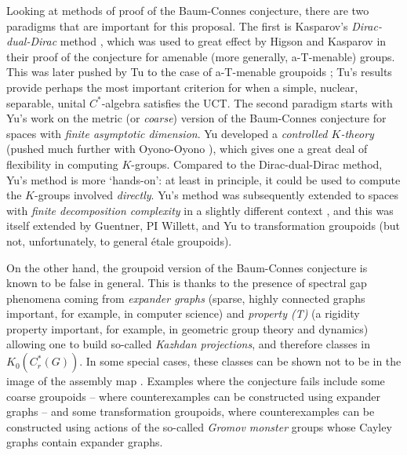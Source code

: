 Looking at methods of proof of the Baum-Connes conjecture, there are two paradigms that are important for this proposal.   The first is Kasparov's \emph{Dirac-dual-Dirac} method \cite{Kasparov:1988dw}, which was used to great effect by Higson and Kasparov \cite{Higson:2001eb} in their proof of the conjecture for amenable (more generally, a-T-menable) groups.  This was later pushed by Tu to the case of a-T-menable groupoids \cite{Tu:1999bq}; Tu's results provide perhaps the most important criterion for when a simple, nuclear, separable, unital $C^*$-algebra satisfies the UCT.  The second paradigm starts with Yu's work \cite{Yu:1998wj} on the metric (or \emph{coarse}) version of the Baum-Connes conjecture for spaces with \emph{finite asymptotic dimension}.  Yu developed a \emph{controlled $K$-theory} (pushed much further with Oyono-Oyono \cite{Oyono-Oyono:2011fk}), which gives one a great deal of flexibility in computing $K$-groups.  Compared to the Dirac-dual-Dirac method, Yu's method is more `hands-on': at least in principle, it could be used to compute the $K$-groups involved \emph{directly}.  Yu's method was subsequently extended to spaces with \emph{finite decomposition complexity} in a slightly different context \cite{Guentner:2009tg}, and this was itself extended by Guentner, PI Willett, and Yu to transformation groupoids \cite{Guentner:2014bh} (but not, unfortunately, to general \'{e}tale groupoids).

On the other hand, the groupoid version of the Baum-Connes conjecture is known to be false in general.  This is thanks to the presence of spectral gap phenomena coming from \emph{expander graphs} \cite{Lubotzky:1994tw} (sparse, highly connected graphs important, for example, in computer science) and \emph{property (T)} \cite{Bekka:2000kx} (a rigidity property important, for example, in geometric group theory and dynamics) allowing one to build so-called \emph{Kazhdan projections}, and therefore classes in $K_0(C^*_r(G))$.  In some special cases, these classes can be shown not to be in the image of the assembly map \cite{Higson:2002la}.  Examples where the conjecture fails include some coarse groupoids -- where counterexamples can be constructed using expander graphs -- and some transformation groupoids, where counterexamples can be constructed using actions of the so-called \emph{Gromov monster} groups whose Cayley graphs contain expander graphs.  













